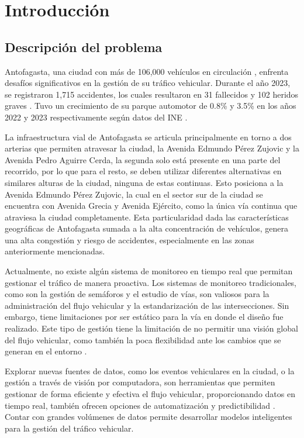 \documentclass[12pt]{article}
\begin{document}
\section{Introducción}
\subsection{Descripción del problema}

Antofagasta, una ciudad con más de 106,000 vehículos en circulación \parencite{conaset2023}, enfrenta desafíos significativos en la gestión de su tráfico vehicular. Durante el año 2023, se registraron 1,715 accidentes, los cuales resultaron en 31 fallecidos y 102 heridos graves \parencite{conaset2023}. Tuvo un crecimiento de su parque automotor de 0.8\% y 3.5\% en los años 2022 y 2023 respectivamente según datos del INE \parencite{ine2023}.

La infraestructura vial de Antofagasta se articula principalmente en torno a dos arterias que permiten atravesar la ciudad, la Avenida Edmundo Pérez Zujovic y la Avenida Pedro Aguirre Cerda, la segunda solo está presente en una parte del recorrido, por lo que para el resto, se deben utilizar diferentes alternativas en similares alturas de la ciudad, ninguna de estas continuas. Esto posiciona a la Avenida Edmundo Pérez Zujovic, la cual en el sector sur de la ciudad se encuentra con Avenida Grecia y Avenida Ejército, como la única vía continua que atraviesa la ciudad completamente. Esta particularidad dada las características geográficas de Antofagasta sumada a la alta concentración de vehículos, genera una alta congestión y  riesgo de accidentes, especialmente en las zonas anteriormente mencionadas.

Actualmente, no existe algún sistema de monitoreo en tiempo real que permitan gestionar el tráfico de manera proactiva. Los sistemas de monitoreo tradicionales, como son la gestión de semáforos y el estudio de vías, son valiosos para la administración del flujo vehicular y la estandarización de las intersecciones. Sin embargo, tiene limitaciones por ser estático para la vía en donde el diseño fue realizado. Este tipo de gestión tiene la limitación de no permitir una visión global del flujo vehicular, como también la poca flexibilidad ante los cambios que se generan en el entorno \parencite{auld2009}.

Explorar nuevas fuentes de datos, como los eventos vehiculares en la ciudad, o la gestión a través de visión por computadora, son herramientas que permiten gestionar de forma eficiente y efectiva el flujo vehicular, proporcionando datos en tiempo real, también ofrecen opciones de automatización y predictibilidad \parencite{chen2015}. Contar con grandes volúmenes de datos permite desarrollar modelos inteligentes para la gestión del tráfico vehicular.
\end{document}
